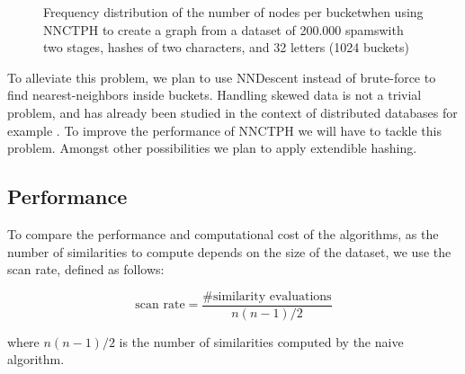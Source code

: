 \documentclass[wcp]{jmlr}
\begin{document}
\begin{figure}
  \centering
  \newlength\figureheight
  \newlength\figurewidth
  \setlength\figureheight{6cm}
  \setlength\figurewidth{10cm}


\caption{Frequency distribution of the number of nodes per bucket\newline when using NNCTPH to create a graph from a dataset of 200.000 spams\newline with two stages, hashes of two characters, and 32 letters (1024 buckets)}
\label{figure:frequency}
\end{figure}

To alleviate this problem, we plan to use NNDescent instead of brute-force to find nearest-neighbors inside buckets. Handling skewed data is not a trivial problem, and has already been studied in the context of distributed databases for example \cite{Xu:2008:HDS:1376616.1376720}. To improve the performance of NNCTPH we will have to tackle this problem. Amongst other possibilities we plan to apply extendible hashing.

\subsection{Performance}

To compare the performance and computational cost of the algorithms, as the number of similarities to compute depends on the size of the dataset, we use the scan rate, defined as follows:

$$ \text{scan rate} = \frac{\text{\# similarity evaluations}}{n (n-1) / 2} $$

where $n (n-1) / 2$ is the number of similarities computed by the naive algorithm.
\end{document}
